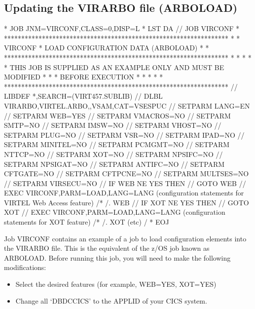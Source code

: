 \documentclass[letterpaper,10pt,english]{sphinxmanual}
\begin{document}
\subsection{Updating the VIRARBO file (ARBOLOAD)}
\label{\detokenize{Installation_Guide:updating-the-virarbo-file-arboload}}
\begin{sphinxVerbatim}[commandchars=\\\{\}]
* \PYGZdl{}\PYGZdl{} JOB JNM=VIRCONF,CLASS=0,DISP=L
* \PYGZdl{}\PYGZdl{} LST DA
// JOB VIRCONF
* *****************************************************************
* * VIRCONF * LOAD CONFIGURATION DATA (ARBOLOAD) *
* *****************************************************************
* * *
* * THIS JOB IS SUPPLIED AS AN EXAMPLE ONLY AND MUST BE MODIFIED *
* * BEFORE EXECUTION *
* * *
* *****************************************************************
// LIBDEF *,SEARCH=(VIRT457.SUBLIB)
// DLBL VIRARBO,\PYGZsq{}VIRTEL.ARBO\PYGZsq{},,VSAM,CAT=VSESPUC
// SETPARM LANG=EN
// SETPARM WEB=YES
// SETPARM VMACROS=NO
// SETPARM SMTP=NO
// SETPARM IMSW=NO
// SETPARM VHOST=NO
// SETPARM PLUG=NO
// SETPARM VSR=NO
// SETPARM IPAD=NO
// SETPARM MINITEL=NO
// SETPARM PCMGMT=NO
// SETPARM NTTCP=NO
// SETPARM XOT=NO
// SETPARM NPSIFC=NO
// SETPARM NPSIGAT=NO
// SETPARM ANTIFC=NO
// SETPARM CFTGATE=NO
// SETPARM CFTPCNE=NO
// SETPARM MULTSES=NO
// SETPARM VIRSECU=NO
// IF WEB NE YES THEN
// GOTO WEB
// EXEC VIRCONF,PARM=\PYGZsq{}LOAD,LANG=\PYGZam{}LANG\PYGZsq{}
  (configuration statements for VIRTEL Web Access feature)
/*
/. WEB
// IF XOT NE YES THEN
// GOTO XOT
// EXEC VIRCONF,PARM=\PYGZsq{}LOAD,LANG=\PYGZam{}LANG\PYGZsq{}
  (configuration statements for XOT feature)
/*
/. XOT
  (etc)
/\PYGZam{}
* \PYGZdl{}\PYGZdl{} EOJ
\end{sphinxVerbatim}


Job VIRCONF contains an example of a job to load configuration elements into the VIRARBO file. This is the equivalent of the z/OS job known as ARBOLOAD. Before running this job, you will need to make the following modifications:
\begin{itemize}
\item {} 
Select the desired features (for example, WEB=YES, XOT=YES)

\item {} 
Change all ‘DBDCCICS’ to the APPLID of your CICS system.

\end{itemize}
\end{document}
